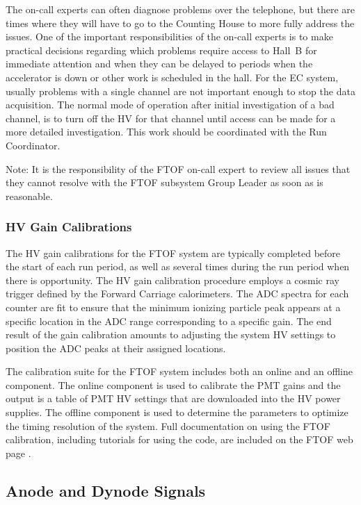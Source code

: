 \documentclass[letterpaper,10pt]{article}
\begin{document}
The on-call experts can often diagnose problems over the telephone, but there are times where they
will have to go to the Counting House to more fully address the issues. One of the important
responsibilities of the on-call experts is to make practical decisions regarding which problems 
require access to Hall~B for immediate attention and when they can be delayed to periods when the 
accelerator is down or other work is scheduled in the hall. For the EC system, usually problems 
with a single channel are not important enough to stop the data acquisition. The normal mode of 
operation after initial investigation of a bad channel, is to turn off the HV for that channel 
until access can be made for a more detailed investigation. This work should be coordinated with
the Run Coordinator.

Note: It is the responsibility of the FTOF on-call expert to review all issues that they cannot
resolve with the FTOF subsystem Group Leader as soon as is reasonable.

\subsubsection{HV Gain Calibrations}
\label{gain-calib}

The HV gain calibrations for the FTOF system are typically completed before the start of each run
period, as well as several times during the run period when there is opportunity. The HV gain 
calibration procedure employs a cosmic ray trigger defined by the Forward Carriage calorimeters. 
The ADC spectra for each counter are fit to ensure that the minimum ionizing particle peak appears 
at a specific location in the ADC range corresponding to a specific gain. The end result of the 
gain calibration amounts to adjusting the system HV settings to position the ADC peaks at their 
assigned locations.

The calibration suite for the FTOF system includes both an online and an offline component. The
online component is used to calibrate the PMT gains and the output is a table of PMT HV settings
that are downloaded into the HV power supplies. The offline component is used to determine the
parameters to optimize the timing resolution of the system. Full documentation on using the
FTOF calibration, including tutorials for using the code, are included on the FTOF web page
\cite{ftof-web}.

\subsection{Anode and Dynode Signals}
\label{pmt-signals}
\end{document}
